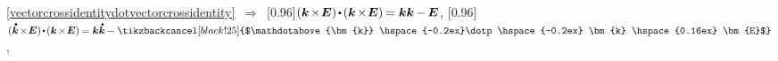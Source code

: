 \begin{otherlanguage}{russian}
\vspace{-0.4em} \noindent \eqref{vectorcrossidentitydotvectorcrossidentity} $\,\Rightarrow\,$
\scalebox{0.95}[0.96]{${( \bm{k} \hspace{-0.24ex}\times\hspace{-0.4ex} \bm{E} ) \hspace{-0.2ex} \dotp \hspace{-0.2ex} ( \bm{k} \hspace{-0.24ex}\times\hspace{-0.4ex} \bm{E} ) \hspace{-0.16ex} = \bm{k} \bm{k} \hspace{-0.1ex} - \hspace{-0.2ex} \bm{E}}$},\hspace{0.4ex}
%
\scalebox{0.95}[0.96]{${\displaystyle ( \mathdotabove{\bm{k}} \hspace{-0.24ex}\times\hspace{-0.4ex} \bm{E} ) \hspace{-0.2ex} \dotp \hspace{-0.2ex} ( \bm{k} \hspace{-0.24ex}\times\hspace{-0.4ex} \bm{E} ) \hspace{-0.16ex} = \bm{k} \mathdotabove{\bm{k}} \hspace{-0.1ex} - \tikzbackcancel[black!25]{$\mathdotabove{\bm{k}} \hspace{-0.2ex}\dotp\hspace{-0.2ex} \bm{k} \hspace{0.16ex} \bm{E}$}}$\hspace{0.16ex}},


\end{otherlanguage}
